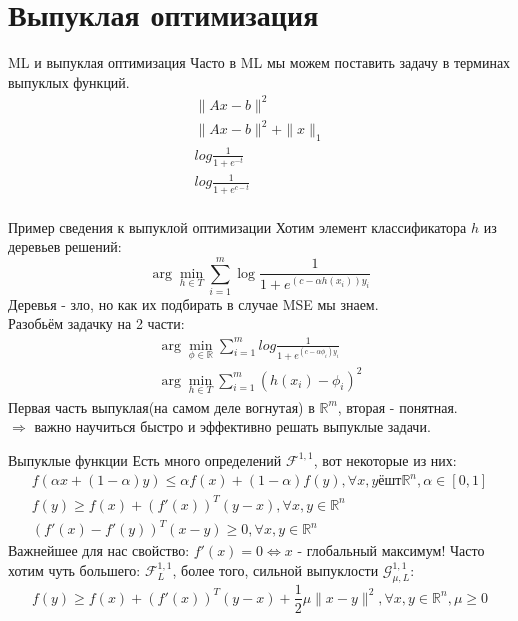 \documentclass[14pt, fleqn, xcolor={dvipsnames, table}]{beamer}
\begin{document}
\section{Выпуклая оптимизация}

\begin{frame}{ML и выпуклая оптимизация}
Часто в ML мы можем поставить задачу в терминах выпуклых функций.
$$\begin{array}{l}
  \|Ax - b\|^2 \\
  \|Ax - b\|^2 + \|x\|_1 \\
  log\frac{1}{1+e^{-t}} \\
  log\frac{1}{1+e^{c-t}} \\
\end{array}$$
\end{frame}


\begin{frame}{Пример сведения к выпуклой оптимизации}
\small
Хотим элемент классификатора $h$ из деревьев решений:
$$
\arg\min_{h \in T}\sum_{i=1}^m \log\frac{1}{1+e^{(c - \alpha h(x_i))y_i}}
$$
Деревья - зло, но как их подбирать в случае MSE мы знаем. \\
Разобьём задачку на 2 части:
$$\begin{array}{l}
  \arg\min_{\phi \in \mathbb{R}}\sum_{i=1}^mlog\frac{1}{1+e^{(c - \alpha \phi_i)y_i}} \\
  \arg\min_{h \in T}\sum_{i=1}^m(h(x_i) - \phi_i)^2
\end{array}$$
Первая часть выпуклая(на самом деле вогнутая) в $\mathbb{R}^m$, вторая - понятная. \\
$\Rightarrow$ важно научиться быстро и эффективно решать выпуклые задачи.
\end{frame}

\begin{frame}{Выпуклые функции}
\small
Есть много определений $\mathcal{F}^{1,1}$, вот некоторые из них:
$$\begin{array}{l}
  f(\alpha x + (1- \alpha)y) \le \alpha f(x) + (1-\alpha)f(y), \forall x,y ёшт \mathbb{R}^n, \alpha \in [0,1] \\
  f(y) \ge f(x) + (f'(x))^T(y-x), \forall x,y \in \mathbb{R}^n \\
  (f'(x) - f'(y))^T(x-y) \ge 0, \forall x,y \in \mathbb{R}^n 
\end{array}$$
Важнейшее для нас свойство: $f'(x) = 0 \Leftrightarrow x$ - глобальный максимум! Часто хотим чуть большего: $\mathcal{F}_L^{1,1}$, более того, сильной выпуклости $\mathcal{G}_{\mu, L}^{1,1}$:  \\
$$
f(y) \ge f(x) + (f'(x))^T(y-x) + \frac{1}{2}\mu\|x-y\|^2, \forall x,y \in \mathbb{R}^n, \mu \ge 0 
$$
\end{frame}
\end{document}
